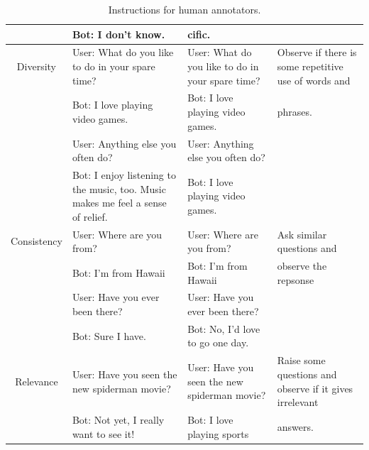 \begin{table}[th]
\begin{tabular}{cp{4.5cm}p{4.5cm}p{3.5cm}}
 & Bot: I don't know. &cific.\\
\midrule
Diversity  &User: What do you like to do in your spare time? & 
User: What do you like to do in your spare time?&
Observe if there is some repetitive use of words and\\
&Bot: I love playing video games. & Bot: I love playing video games. & phrases.\\
&User: Anything else you often do?  & User: Anything else you often do?  & \\
&Bot:  I enjoy listening to the music, too. Music makes me feel a sense of relief.& Bot:  I love playing video games. & \\
\midrule
Consistency  &
User: Where are you from? &User: Where are you from? &Ask similar questions and \\
& Bot: I'm from Hawaii & Bot: I'm from Hawaii &  observe the repsonse\\
&  User: Have you ever been there? &  User: Have you ever been there? & \\
&  Bot: Sure I have. &  Bot: No, I'd love to go one day. & \\
\midrule
Relevance &
 User: Have you seen the new spiderman movie? & 
User: Have you seen the new spiderman movie? &
Raise some questions and observe if it gives irrelevant\\
& Bot: Not yet, I really want to see it! &  Bot: I love playing sports &answers. \\
\bottomrule
\end{tabular}
\caption{Instructions for human annotators.}
\label{tab:human}
\end{table}
